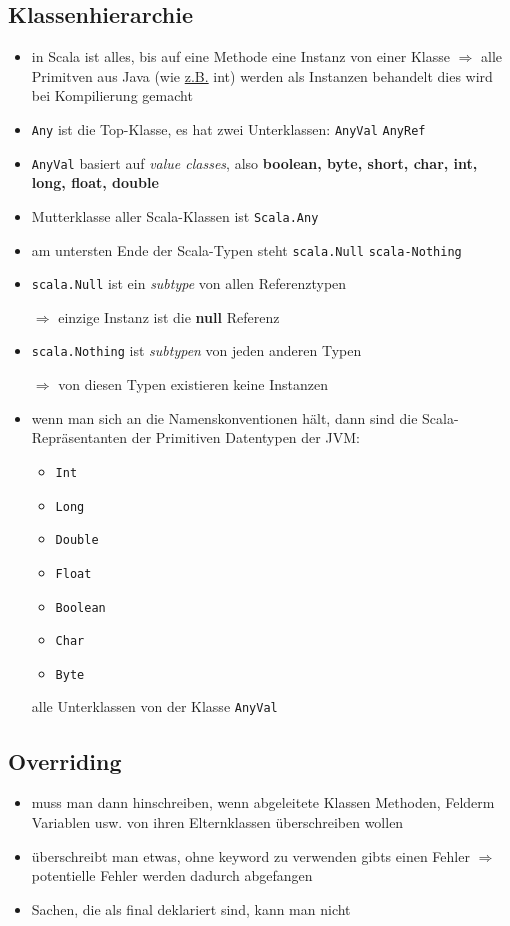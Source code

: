 \subsection{Klassenhierarchie}
\begin{itemize}
  \item in Scala ist alles, bis auf eine Methode eine Instanz von
  einer Klasse $\Rightarrow$ alle Primitven aus Java (wie \uline{z.B.} int) 
  werden als Instanzen behandelt \und dies wird bei Kompilierung gemacht
  \item \texttt{Any} ist die Top-Klasse, es hat zwei Unterklassen:
  \texttt{AnyVal} \und \texttt{AnyRef}
  \item \texttt{AnyVal}  basiert auf \textit{value classes}, also
  \textbf{boolean, byte, short, char, int, long, float, double}
  \item Mutterklasse aller Scala-Klassen ist \texttt{Scala.Any}
  \item am untersten Ende der Scala-Typen steht \texttt{scala.Null}
  \und \texttt{scala-Nothing}
  \item \texttt{scala.Null} ist ein \textit{subtype} von allen Referenztypen
  
  $\Rightarrow$ einzige Instanz ist die \textbf{null} Referenz
  \item \texttt{scala.Nothing} ist \textit{subtypen} von jeden anderen Typen
  
  $\Rightarrow$ von diesen Typen existieren keine Instanzen
  \item wenn man sich an die Namenskonventionen hält, dann sind
  die Scala-Repräsentanten der Primitiven Datentypen der JVM:
  \begin{itemize}
    \item \texttt{Int}
    \item \texttt{Long}
    \item \texttt{Double}
    \item \texttt{Float}
    \item \texttt{Boolean}
    \item \texttt{Char}
    \item \texttt{Byte}
  \end{itemize} 
  
  alle Unterklassen von der Klasse \texttt{AnyVal}
\end{itemize}


\subsection{Overriding}
\begin{itemize}
  \item muss man dann hinschreiben, wenn abgeleitete Klassen Methoden, Felderm
  Variablen usw. von ihren Elternklassen überschreiben wollen
  \item überschreibt man etwas, ohne keyword  zu verwenden
  gibts einen Fehler $\Rightarrow$ potentielle Fehler werden dadurch
  abgefangen
  \item Sachen, die als final deklariert sind, kann man nicht 
\end{itemize}


